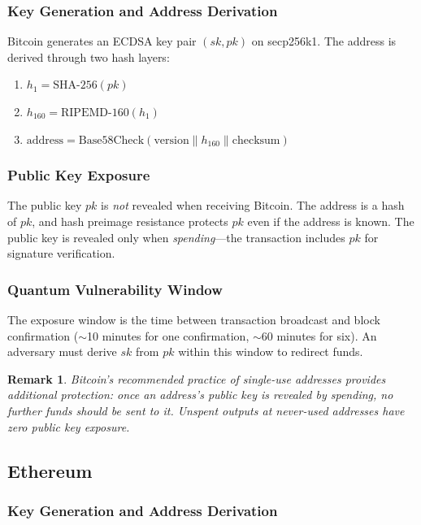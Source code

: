 \documentclass[11pt,a4paper]{article}
\newtheorem{remark}{Remark}[section]
\begin{document}
\subsubsection{Key Generation and Address Derivation}

Bitcoin generates an ECDSA key pair $(sk, pk)$ on secp256k1. The
address is derived through two hash layers:

\begin{enumerate}[nosep]
  \item $h_1 = \text{SHA-256}(pk)$
  \item $h_{160} = \text{RIPEMD-160}(h_1)$
  \item $\text{address} = \text{Base58Check}(\text{version} \| h_{160}
        \| \text{checksum})$
\end{enumerate}

\subsubsection{Public Key Exposure}

The public key $pk$ is \emph{not} revealed when receiving Bitcoin. The
address is a hash of $pk$, and hash preimage resistance protects $pk$
even if the address is known. The public key is revealed only when
\emph{spending}---the transaction includes $pk$ for signature
verification.

\subsubsection{Quantum Vulnerability Window}

The exposure window is the time between transaction broadcast and
block confirmation ($\sim$10 minutes for one confirmation, $\sim$60
minutes for six). An adversary must derive $sk$ from $pk$ within this
window to redirect funds.

\begin{remark}
Bitcoin's recommended practice of single-use addresses provides
additional protection: once an address's public key is revealed by
spending, no further funds should be sent to it. Unspent outputs at
never-used addresses have zero public key exposure.
\end{remark}

\subsection{Ethereum}

\subsubsection{Key Generation and Address Derivation}
\end{document}
